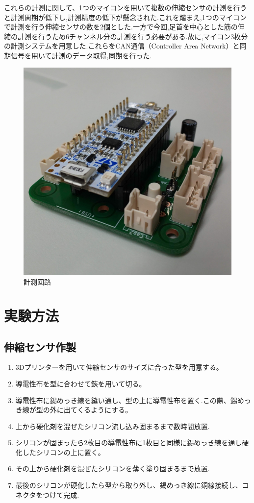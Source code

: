 これらの計測に関して、1つのマイコンを用いて複数の伸縮センサの計測を行うと計測周期が低下し,計測精度の低下が懸念された.これを踏まえ,1つのマイコンで計測を行う伸縮センサの数を2個とした.一方で今回,足首を中心とした筋の伸縮の計測を行うため6チャンネル分の計測を行う必要がある.故に,マイコン3枚分の計測システムを用意した.これらをCAN通信（Controller Area Network）と同期信号を用いて計測のデータ取得,同期を行った.
\begin{figure}[!t]
 \begin{center}
  \includegraphics[width=0.5\columnwidth,clip]{Photo/BackGround/circuit.eps}
  \caption{計測回路}
  \label{circuit}
 \end{center}
\end{figure}

\section{実験方法}
\subsection{伸縮センサ作製}
\begin{enumerate}
    \item 3Dプリンターを用いて伸縮センサのサイズに合った型を用意する。
    \item 導電性布を型に合わせて鋏を用いて切る。
    \item 導電性布に錫めっき線を縫い通し、型の上に導電性布を置く.この際、錫めっき線が型の外に出てくるようにする。
    \item 上から硬化剤を混ぜたシリコン流し込み固まるまで数時間放置.
    \item シリコンが固まったら2枚目の導電性布に1枚目と同様に錫めっき線を通し硬化したシリコンの上に置く。
    \item その上から硬化剤を混ぜたシリコンを薄く塗り固まるまで放置.
    \item 最後のシリコンが硬化したら型から取り外し、錫めっき線に銅線接続し、コネクタをつけて完成.
\end{enumerate}
